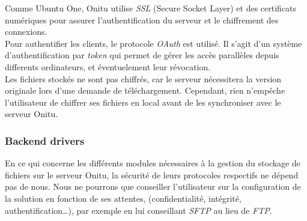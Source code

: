 Comme Ubuntu One, Onitu utilise \textit{SSL} (Secure Socket Layer) et des certificats numériques pour assurer l'authentification du serveur et le chiffrement des connexions.\\

Pour authentifier les clients, le protocole \textit{OAuth} est utilisé. Il s'agit d'un système d'authentification par \textit{token} qui permet de gérer les accès parallèles depuis differents ordinateurs, et éventuelement leur révocation.\\

Les fichiers stockés ne sont pas chiffrés, car le serveur nécessitera la version originale lors d'une demande de téléchargement. Cependant, rien n'empêche l'utilisateur de chiffrer ses fichiers en local avant de les synchroniser avec le serveur Onitu.

\subsubsection{Backend drivers}
En ce qui concerne les différents modules nécessaires à la gestion du stockage de fichiers sur le serveur Onitu, la sécurité de leurs protocoles respectifs ne dépend pas de nous. Nous ne pourrons que conseiller l'utilisateur sur la configuration de la solution en fonction de ses attentes, (confidentialité, intégrité, authentification…), par exemple en lui conseillant \textit{SFTP} au lieu de \textit{FTP}.
